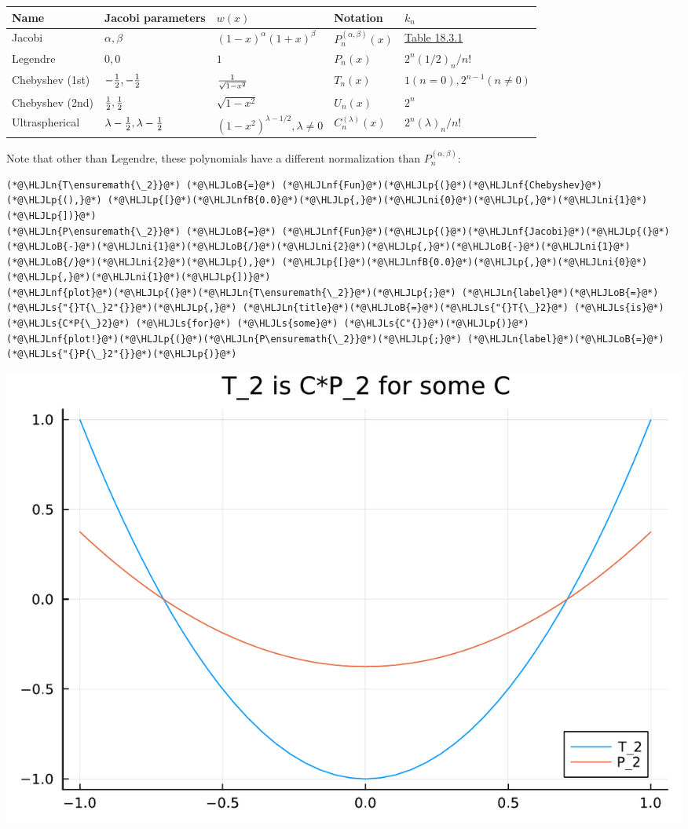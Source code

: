 \documentclass[12pt,a4paper]{article}
\newcommand{\HLJLn}[1]{#1}
\newcommand{\HLJLnf}[1]{\textcolor[RGB]{66,102,213}{#1}}
\newcommand{\HLJLs}[1]{\textcolor[RGB]{201,61,57}{#1}}
\newcommand{\HLJLnfB}[1]{\textcolor[RGB]{59,151,46}{#1}}
\newcommand{\HLJLni}[1]{\textcolor[RGB]{59,151,46}{#1}}
\newcommand{\HLJLoB}[1]{\textcolor[RGB]{102,102,102}{\textbf{#1}}}
\newcommand{\HLJLp}[1]{#1}
\begin{document}
\begin{tabular}
{l | l | l | l | l}
Name & Jacobi parameters & $w(x)$ & Notation & $k_n$ \\
\hline
Jacobi & $\alpha,\beta$ & $(1-x)^{\alpha} (1+x)^\beta$ & $P_n^{(\alpha,\beta)}(x)$ & \href{http://dlmf.nist.gov/18.3}{Table 18.3.1} \\
Legendre & $0,0$ & $1$ & $P_n(x)$ & $2^n(1/2)_n/n!$ \\
Chebyshev (1st) & $-{1 \over 2},-{1 \over 2}$ & $1 \over \sqrt{1-x^2}$ & $T_n(x)$ & $1 (n=0), 2^{n-1} (n \neq 0)$ \\
Chebyshev (2nd) & ${1 \over 2},{1 \over 2}$ & $\sqrt{1-x^2}$ & $U_n(x)$ & $2^n$ \\
Ultraspherical & $\lambda-{1 \over 2},\lambda-{1 \over 2}$ & $(1-x^2)^{\lambda - 1/2}, \lambda \neq 0$ & $C_n^{(\lambda)}(x)$ & $2^n(\lambda)_n/n!$ \\
\end{tabular}
Note that other than Legendre, these polynomials have a different normalization than $P_n^{(\alpha,\beta)}$:


\begin{lstlisting}
(*@\HLJLn{T\ensuremath{\_2}}@*) (*@\HLJLoB{=}@*) (*@\HLJLnf{Fun}@*)(*@\HLJLp{(}@*)(*@\HLJLnf{Chebyshev}@*)(*@\HLJLp{(),}@*) (*@\HLJLp{[}@*)(*@\HLJLnfB{0.0}@*)(*@\HLJLp{,}@*)(*@\HLJLni{0}@*)(*@\HLJLp{,}@*)(*@\HLJLni{1}@*)(*@\HLJLp{])}@*)
(*@\HLJLn{P\ensuremath{\_2}}@*) (*@\HLJLoB{=}@*) (*@\HLJLnf{Fun}@*)(*@\HLJLp{(}@*)(*@\HLJLnf{Jacobi}@*)(*@\HLJLp{(}@*)(*@\HLJLoB{-}@*)(*@\HLJLni{1}@*)(*@\HLJLoB{/}@*)(*@\HLJLni{2}@*)(*@\HLJLp{,}@*)(*@\HLJLoB{-}@*)(*@\HLJLni{1}@*)(*@\HLJLoB{/}@*)(*@\HLJLni{2}@*)(*@\HLJLp{),}@*) (*@\HLJLp{[}@*)(*@\HLJLnfB{0.0}@*)(*@\HLJLp{,}@*)(*@\HLJLni{0}@*)(*@\HLJLp{,}@*)(*@\HLJLni{1}@*)(*@\HLJLp{])}@*)
(*@\HLJLnf{plot}@*)(*@\HLJLp{(}@*)(*@\HLJLn{T\ensuremath{\_2}}@*)(*@\HLJLp{;}@*) (*@\HLJLn{label}@*)(*@\HLJLoB{=}@*)(*@\HLJLs{"{}T{\_}2"{}}@*)(*@\HLJLp{,}@*) (*@\HLJLn{title}@*)(*@\HLJLoB{=}@*)(*@\HLJLs{"{}T{\_}2}@*) (*@\HLJLs{is}@*) (*@\HLJLs{C*P{\_}2}@*) (*@\HLJLs{for}@*) (*@\HLJLs{some}@*) (*@\HLJLs{C"{}}@*)(*@\HLJLp{)}@*)
(*@\HLJLnf{plot!}@*)(*@\HLJLp{(}@*)(*@\HLJLn{P\ensuremath{\_2}}@*)(*@\HLJLp{;}@*) (*@\HLJLn{label}@*)(*@\HLJLoB{=}@*)(*@\HLJLs{"{}P{\_}2"{}}@*)(*@\HLJLp{)}@*)
\end{lstlisting}

\includegraphics[width=\linewidth]{jl_dOthw0/OP_methods_14_1.pdf}
\end{document}
